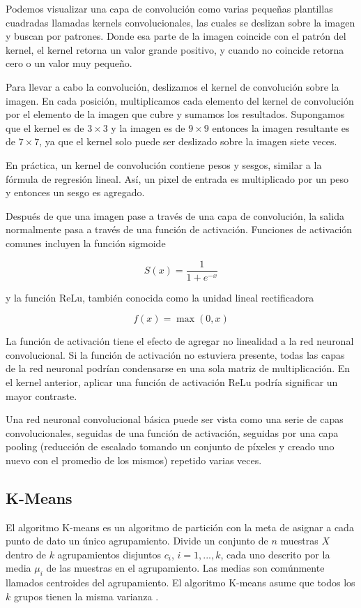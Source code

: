 Podemos visualizar una capa de convolución como varias pequeñas plantillas cuadradas llamadas kernels convolucionales, las cuales se deslizan sobre la imagen y buscan por patrones. Donde esa parte de la imagen coincide con el patrón del kernel, el kernel retorna un valor grande positivo, y cuando no coincide retorna cero o un valor muy pequeño.

Para llevar a cabo la convolución, deslizamos el kernel de convolución sobre la imagen. En cada posición, multiplicamos cada elemento del kernel de convolución por el elemento de la imagen que cubre y sumamos los resultados. Supongamos que el kernel es de $3\times3$ y la imagen es de $9\times 9$ entonces la imagen resultante es de $7\times 7$, ya que el kernel solo puede ser deslizado sobre la imagen siete veces.

En práctica, un kernel de convolución contiene pesos y sesgos, similar a la fórmula de regresión lineal. Así, un pixel de entrada es multiplicado por un peso y entonces un sesgo es agregado.

Después de que una imagen pase a través de una capa de convolución, la salida normalmente pasa a través de una función de activación. Funciones de activación comunes incluyen la función sigmoide

\[
S(x)=\frac{1}{1+e^{-x}}
\]

y la función ReLu, también conocida como la unidad lineal rectificadora

\[
f(x)=\max (0, x)
\]
 
La función de activación tiene el efecto de agregar no linealidad a la red neuronal convolucional. Si la función de activación no estuviera presente, todas las capas de la red neuronal podrían condensarse en una sola matriz de multiplicación. En el kernel anterior, aplicar una función de activación ReLu podría significar un mayor contraste.

Una red neuronal convolucional básica puede ser vista como una serie de capas convolucionales, seguidas de una función de activación, seguidas por una capa pooling (reducción de escalado tomando un conjunto de píxeles y creado uno nuevo con el promedio de los mismos) repetido varias veces.
 

\subsection{K-Means}

El algoritmo K-means es un algoritmo de partición con la meta de asignar a cada punto de dato un único agrupamiento. Divide un conjunto de $n$ muestras $X$ dentro de $k$ agrupamientos disjuntos $c_i$, $i=1,...,k$, cada uno descrito por la media $\mu_i$ de las muestras en el agrupamiento. Las medias son comúnmente llamados centroides del agrupamiento. El algoritmo K-means asume que todos los $k$ grupos tienen la misma varianza \cite{igualIntroductionDataScience2017}.

